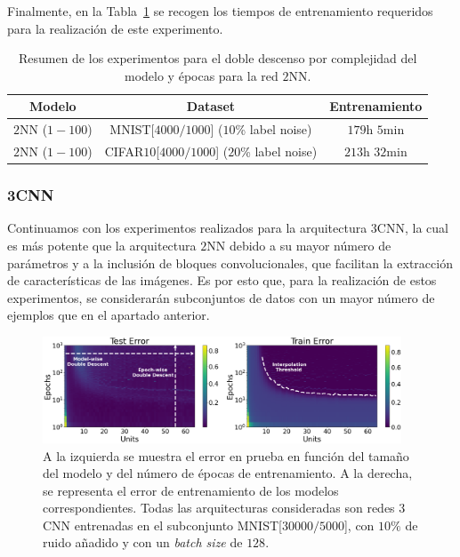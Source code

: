 Finalmente, en la Tabla~\ref{tab:2nn_model-epochwise} se recogen los tiempos de entrenamiento requeridos para la realización de este experimento.

\begin{table}[h!]
    \centering
    \begin{tabular}{|c|c|c|}
    \hline
    \textbf{Modelo}       & \textbf{Dataset} & \textbf{Entrenamiento} \\ 
    \hline
    $2$NN ($1-100$)      & MNIST[$4000/1000$] ($10$\% label noise)        & $179$h $5$min \\ 
    $2$NN ($1-100$)      & CIFAR$10$[$4000/1000$]  ($20$\% label noise)   & $213$h $32$min \\
    \hline
    \end{tabular}
    \caption[Resumen de los experimentos para el doble descenso por complejidad del modelo y épocas para la red $2$NN.]{Resumen de los experimentos para el doble descenso por complejidad del modelo y épocas para la red $2$NN.}\label{tab:2nn_model-epochwise}
\end{table}

\subsubsection{3CNN}\label{subsubsec:model-epoch-wise-3CNN}

Continuamos con los experimentos realizados para la arquitectura $3$CNN, la cual es más potente que la arquitectura $2$NN debido a su mayor número de parámetros y a la inclusión de bloques convolucionales, que facilitan la extracción de características de las imágenes. Es por esto que, para la realización de estos experimentos, se considerarán subconjuntos de datos con un mayor número de ejemplos que en el apartado anterior.

\begin{figure}[h]
    \centering
    \includegraphics[width=0.95\textwidth]{img/experiments/model-epoch3CNNMNIST30k.png}
    \caption[Doble descenso en función del tamaño del modelo y del número de épocas para la red $3$CNN y un subconjunto de MNIST.]{A la izquierda se muestra el error en prueba en función del tamaño del modelo y del número de épocas de entrenamiento. A la derecha, se representa el error de entrenamiento de los modelos correspondientes. Todas las arquitecturas consideradas son redes $3$CNN entrenadas en el subconjunto MNIST[$30000/5000$], con $10\%$ de ruido añadido y con un \textit{batch size} de $128$.}\label{fig:model-epoch3CNNMNIST30k}
\end{figure}

